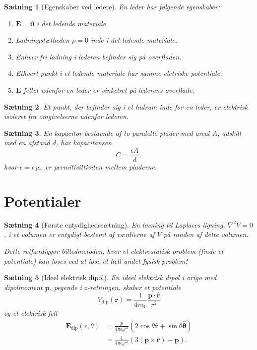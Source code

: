 \documentclass[]{article}
\newcommand{\hr}{\hat{\mathbf{r}}}
\newcommand{\hth}{\hat{\bm{\theta}}}
\newtheorem{theorem}{Sætning}
\theoremstyle{definition}
\begin{document}
\begin{theorem}[Egenskaber ved ledere]
	En leder har følgende egenskaber:
	\begin{enumerate}
		\item  $\mathbf{E} = \mathbf{0}$ i det ledende materiale.
		\item  Ladningstætheden $\rho = 0$ inde i det ledende materiale.
		\item Enhver fri ladning i lederen befinder sig på overfladen.
		\item Ethvert punkt i et ledende materiale har samme eletriske potentiale.
		\item $\mathbf{E}$-feltet udenfor en leder er vinkelret på lederens overflade.
	\end{enumerate} 
\end{theorem}

\begin{theorem}
	Et punkt, der befinder sig i et hulrum inde for en leder, er elektrisk isoleret fra omgivelserne udenfor lederen.
\end{theorem}

\begin{theorem}
	En kapacitor bestående af to paralelle plader med areal $A$, adskilt med en afstand $d$, har kapacitansen
	\begin{equation*}
		C = \frac{\epsilon A}{d},
	\end{equation*}
	hvor $\epsilon = \epsilon_0 \epsilon_r$ er permitivittiviten mellem pladerne.
\end{theorem}

\section{Potentialer}

\begin{theorem}[Første entydighedssætning]
	En løsning til Laplaces ligning, $\nabla^2 V = 0$, i et volumen er entydigt bestemt af værdierne af $V$ på randen af dette volumen.
	
	Dette retfærdiggør billedmetoden, hvor et elektrostatisk problem (finde et potentiale) kan løses ved at løse et helt andet fysisk problem!
\end{theorem}

\begin{theorem}[Ideel elektrisk dipol]
	En ideel elektrisk dipol i origo med dipolmoment $\mathbf{p}$, pegende i $z$-retningen, skaber et potentiale
	\begin{equation*}
		V_\text{dip}(\mathbf{r}) = \frac{1}{4\pi \epsilon_0} \frac{\mathbf{p} \cdot \hat {\mathbf{r}}}{r^2}
	\end{equation*}
	og et elektrisk felt
	\begin{align*}
		\mathbf{E}_\text{dip}(r, \theta) &= \frac{p}{4\pi \epsilon_0  r^3}(2 \cos \theta \hr + \sin \theta \hth)\\
		&= \frac{1}{4\pi \epsilon_0  r^3}(3(\mathbf{p}\times \hr) - \mathbf{p}).
	\end{align*}
\end{theorem}
\end{document}
